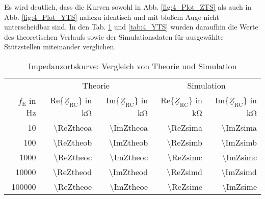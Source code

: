 %
Es wird deutlich, dass die Kurven sowohl in Abb. \ref{fig:4_Plot_ZTS} als auch in Abb. \ref{fig:4_Plot_YTS} nahezu identisch und mit bloßem Auge nicht unterscheidbar sind. In den Tab. \ref{tab:4_ZTS} und \ref{tab:4_YTS} wurden daraufhin die Werte des theoretischen Verlaufs sowie der Simulationsdaten für ausgewählte Stützstellen miteinander verglichen.
%
\begin{table}[H]
  \centering
	\caption{Impedanzortskurve: Vergleich von Theorie und Simulation}
	\label{tab:4_ZTS}
	\renewcommand*{\arraystretch}{1.25}
	\begin{tabular}{rrrrr}
	  \toprule
	  \multicolumn{1}{c}{} &
		\multicolumn{2}{c}{Theorie} &
		\multicolumn{2}{c}{Simulation} \\
		\cmidrule(lr{1mm}){2-3}\cmidrule(lr{1mm}){4-5}
    $f_\mathrm{E}$ in \si{\hertz} &
    $\text{Re}\{\underline{Z}_\mathrm{RC}\}$ in \si{\kilo\ohm} &
    $\text{Im}\{\underline{Z}_\mathrm{RC}\}$ in \si{\kilo\ohm} &
    $\text{Re}\{\underline{Z}_\mathrm{RC}\}$ in \si{\kilo\ohm} &
    $\text{Im}\{\underline{Z}_\mathrm{RC}\}$ in \si{\kilo\ohm} \\
		\midrule
    \num{10}     & \num{\ReZtheoa} & \num{\ImZtheoa} & \num{\ReZsima} & \num{\ImZsima} \\
    \num{100}    & \num{\ReZtheob} & \num{\ImZtheob} & \num{\ReZsimb} & \num{\ImZsimb} \\
    \num{1000}   & \num{\ReZtheoc} & \num{\ImZtheoc} & \num{\ReZsimc} & \num{\ImZsimc} \\
    \num{10000}  & \num{\ReZtheod} & \num{\ImZtheod} & \num{\ReZsimd} & \num{\ImZsimd} \\
    \num{100000} & \num{\ReZtheoe} & \num{\ImZtheoe} & \num{\ReZsime} & \num{\ImZsime} \\
		\bottomrule
	\end{tabular}
\end{table}
%
